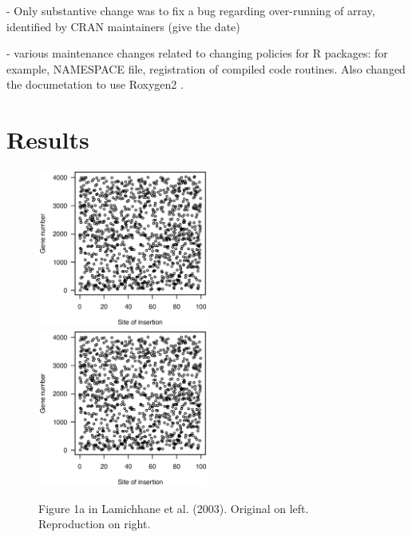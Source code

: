 - Only substantive change was to fix a bug regarding over-running of
  array, identified by CRAN maintainers (give the date)

- various maintenance changes related to changing policies for R
  packages: for example, NAMESPACE file, registration of compiled code
  routines. Also changed the documetation to use
  Roxygen2 \citep{roxygen2}.




\section{Results}


\begin{figure}
\includegraphics[viewport=133 224 464 528, width=0.50\textwidth]{../original/Nov02/R/Figs/fig1.ps}
\hfill
\includegraphics[viewport=133 224 464 528, width=0.50\textwidth]{../reproduction/Figs/fig1.ps}

\caption{Figure 1a in Lamichhane et al. (2003). Original on left. Reproduction on right.\label{fig:fig1a}}
\end{figure}

